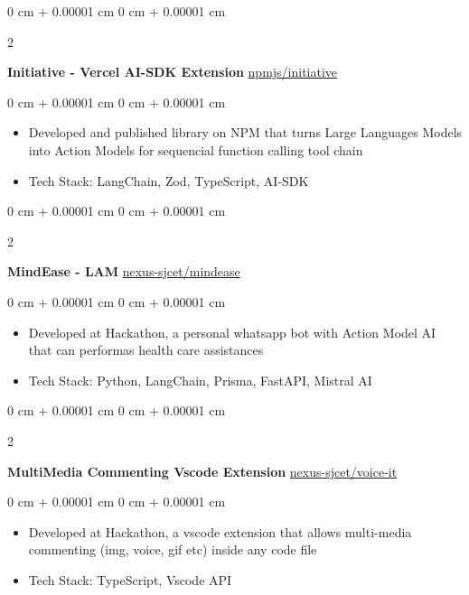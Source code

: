 \documentclass[10pt, letterpaper]{article}
\newenvironment{highlights}{
    \begin{itemize}[
        topsep=0.10 cm,
        parsep=0.10 cm,
        partopsep=0pt,
        itemsep=0pt,
        leftmargin=0 cm + 10pt
    ]
}{
    \end{itemize}
} %
\newenvironment{onecolentry}{
    \begin{adjustwidth}{
        0 cm + 0.00001 cm
    }{
        0 cm + 0.00001 cm
    }
}{
    \end{adjustwidth}
} %
\newenvironment{twocolentry}[2][]{
    \onecolentry
    \def\secondColumn{#2}
    \setcolumnwidth{\fill, 4.5 cm}
    \begin{paracol}{2}
}{
    \switchcolumn \raggedleft \secondColumn
    \end{paracol}
    \endonecolentry
} %
\begin{document}
\begin{twocolentry}{
		\href{https://www.npmjs.com/package/initiative}{npmjs/initiative}
	}
	\textbf{Initiative - Vercel AI-SDK Extension}\end{twocolentry}

\vspace{0.10 cm}
\begin{onecolentry}
	\begin{highlights}
		\item Developed and published library on NPM that turns Large Languages Models into
		Action Models for sequencial function calling tool chain
		\item Tech Stack: LangChain, Zod, TypeScript, AI-SDK
	\end{highlights}
\end{onecolentry}
\vspace{0.2 cm}

\begin{twocolentry}{
		\href{https://github.com/nexus-sjcet/mindease}{nexus-sjcet/mindease}
	}
	\textbf{MindEase - LAM}\end{twocolentry}

\vspace{0.10 cm}
\begin{onecolentry}
	\begin{highlights}
		\item Developed at Hackathon, a personal whatsapp bot with Action Model AI that can
		performas health care assistances
		\item Tech Stack: Python, LangChain, Prisma, FastAPI, Mistral AI
	\end{highlights}
\end{onecolentry}
\vspace{0.2 cm}

\begin{twocolentry}{
		\href{https://github.com/nexus-sjcet/voice-it}{nexus-sjcet/voice-it}
	}
	\textbf{MultiMedia Commenting Vscode Extension}\end{twocolentry}

\vspace{0.10 cm}
\begin{onecolentry}
	\begin{highlights}
		\item Developed at Hackathon, a vscode extension that allows multi-media commenting
		(img, voice, gif etc) inside any code file
		\item Tech Stack: TypeScript, Vscode API
	\end{highlights}
\end{onecolentry}
\vspace{0.2 cm}
\end{document}
